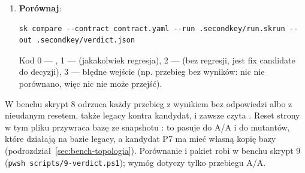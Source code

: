 \begin{enumerate}
        są śledzone (302 to odpowiedź do porównania), a korelacja przenosi wartości
        generowane przez serwer (np. tokeny anti-forgery) z ostatniej odpowiedzi tej samej
        strony. Kod 4 oznacza nieudany reset: scenariusz nie został wysłany do tej strony
        () i przebieg nie jest uczciwym porównaniem. Kod 0 nie
        znaczy, że każda strona odpowiedziała: liczbę wyników bez odpowiedzi podaje
        podsumowanie (\texttt{<n> without an answer}), a każdy taki wynik jest w werdykcie
        regresją . Korelacja czyta tylko odpowiedzi zapisane jako
        tekst (HTML, XML), nie odpowiedzi JSON (sekcja~\ref{sec:cli-sonda}).
         bez pytania nadpisuje przebieg o tej samej ścieżce
         (sekcja~\ref{sec:cli-wywolanie}).
  \item \textbf{Porównaj}:
\begin{lstlisting}
sk compare --contract contract.yaml --run .secondkey/run.skrun --out .secondkey/verdict.json
\end{lstlisting}
        Kod 0 --- , 1 ---  (jakakolwiek regresja),
        2 ---  (bez regresji, jest fix candidate do decyzji), 3 --- błędne
        wejście (np. przebieg bez wyników: nic nie porównano, więc nic nie może przejść).
\end{enumerate}

W benchu skrypt 8 odrzuca każdy przebieg z wynikiem bez odpowiedzi albo z nieudanym resetem,
także legacy kontra kandydat, i zawsze czyta . Reset strony
 w tym pliku przywraca bazę  ze snapshotu
: to pasuje do A/A i do mutantów, które działają na
bazie legacy, a kandydat P7 ma mieć własną kopię bazy (podrozdział~\ref{sec:bench-topologia}).
Porównanie i pakiet robi w benchu skrypt 9 (\texttt{pwsh scripts/9-verdict.ps1}); wymóg
 dotyczy tylko przebiegu A/A.


